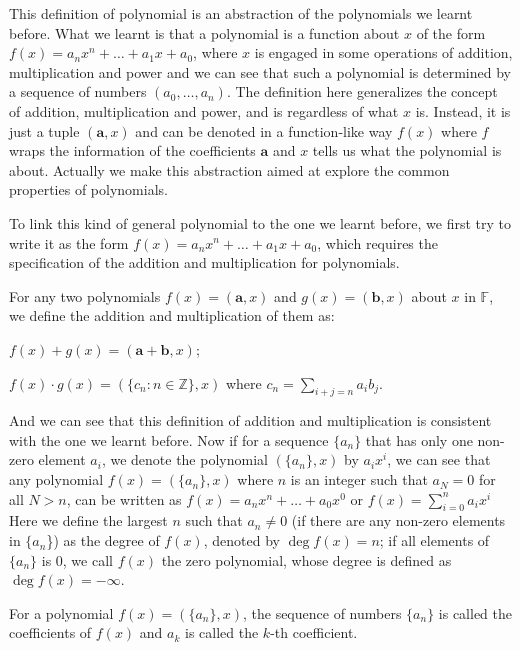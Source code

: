 \documentclass{article}
\begin{document}
\begin{Rmk}{}
    \begin{compactenum}
        \item This definition of polynomial is an abstraction of the polynomials we learnt before. What we learnt is that a polynomial is a function about $x$ of the form $f(x) = a_nx^n+\dots+a_1x+a_0$, where $x$ is engaged in some operations of addition, multiplication and power and we can see that such a polynomial is determined by a sequence of numbers $(a_0, \dots, a_n)$. The definition here generalizes the concept of addition, multiplication and power, and is regardless of what $x$ is. Instead, it is just a tuple $(\pmb{a}, x)$ and can be denoted in a function-like way $f(x)$ where $f$ wraps the information of the coefficients $\pmb{a}$ and $x$ tells us what the polynomial is about. Actually we make this abstraction aimed at explore the common properties of polynomials.
        \item To link this kind of general polynomial to the one we learnt before, we first try to write it as the form $f(x) = a_nx^n + \dots + a_1x + a_0$, which requires the specification of the addition and multiplication for polynomials. \textcolor{Df}{For any two polynomials $f(x) = (\pmb{a}, x)$ and $g(x) = (\pmb{b}, x)$ about $x$ in $\mathbb{F}$, we define the addition and multiplication of them as:
        \begin{compactitem}
            \item $f(x)+g(x) = (\pmb{a}+\pmb{b}, x)$;
            \item $f(x)\cdot g(x) = (\{c_n: n\in\mathbb{Z}\}, x)$ where $c_n = \sum_{i+j = n} a_ib_j$.
        \end{compactitem}}
        And we can see that this definition of addition and multiplication is consistent with the one we learnt before. \textcolor{Th}{Now if for a sequence $\{a_n\}$ that has only one non-zero element $a_i$, we denote the polynomial $(\{a_n\}, x)$ by $a_ix^i$, we can see that any polynomial $f(x) = (\{a_n\}, x)$ where $n$ is an integer such that $a_N=0$ for all $N>n$, can be written as $f(x) = a_nx^n + \dots + a_0x^0$ or $f(x) = \sum_{i=0}^{n} a_ix^i$} \textcolor{Df}{Here we define the largest $n$ such that $a_n\neq 0$ (if there are any non-zero elements in $\{a_n$\}) as the degree of $f(x)$, denoted by $\deg f(x) = n$; if all elements of $\{a_n\}$ is $0$, we call $f(x)$ the zero polynomial, whose degree is defined as $\deg f(x) = -\infty$.}
        \item For a polynomial $f(x) = (\{a_n\}, x)$, the sequence of numbers $\{a_n\}$ is called the coefficients of $f(x)$ and $a_k$ is called the $k$-th coefficient.

\end{compactenum}
\end{Rmk}
\end{document}
